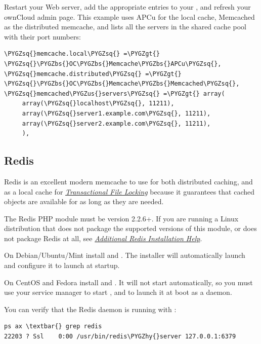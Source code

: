 \documentclass[letterpaper,10pt,english]{sphinxmanual}
\def\PYGZbs{\char`\\}
\def\PYGZus{\char`\_}
\def\PYGZgt{\char`\>}
\def\PYGZhy{\char`\-}
\def\PYGZsq{\char`\'}
\begin{document}
Restart your Web server, add the appropriate entries to your
, and refresh your ownCloud admin page. This example uses APCu
for the local cache, Memcached as the distributed memcache, and lists all the
servers in the shared cache pool with their port numbers:

\begin{Verbatim}[commandchars=\\\{\}]
\PYGZsq{}memcache.local\PYGZsq{} =\PYGZgt{} \PYGZsq{}\PYGZbs{}OC\PYGZbs{}Memcache\PYGZbs{}APCu\PYGZsq{},
\PYGZsq{}memcache.distributed\PYGZsq{} =\PYGZgt{} \PYGZsq{}\PYGZbs{}OC\PYGZbs{}Memcache\PYGZbs{}Memcached\PYGZsq{},
\PYGZsq{}memcached\PYGZus{}servers\PYGZsq{} =\PYGZgt{} array(
     array(\PYGZsq{}localhost\PYGZsq{}, 11211),
     array(\PYGZsq{}server1.example.com\PYGZsq{}, 11211),
     array(\PYGZsq{}server2.example.com\PYGZsq{}, 11211),
     ),
\end{Verbatim}


\subsection{Redis}
\label{configuration_server/caching_configuration:id3}
Redis is an excellent modern memcache to use for both distributed caching, and
as a local cache for {\hyperref[configuration_files/files_locking_transactional::doc]{\emph{Transactional File Locking}}} because it guarantees
that cached objects are available for as long as they are needed.

The Redis PHP module must be version 2.2.6+. If you are running a Linux
distribution that does not package the supported versions of this module, or
does not package Redis at all, see {\hyperref[configuration_server/caching_configuration:install-redis-label]{\emph{Additional Redis Installation Help}}}.

On Debian/Ubuntu/Mint install  and . The installer
will automatically launch  and configure it to launch at
startup.

On CentOS and Fedora install  and . It will not
start automatically, so you must use your service manager to start
, and to launch it at boot as a daemon.

You can verify that the Redis daemon is running with :

\begin{Verbatim}[commandchars=\\\{\}]
ps ax \textbar{} grep redis
22203 ? Ssl    0:00 /usr/bin/redis\PYGZhy{}server 127.0.0.1:6379
\end{Verbatim}
\end{document}
